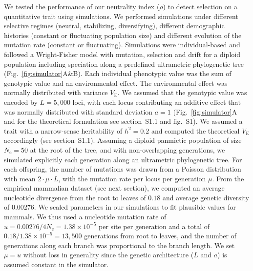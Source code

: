 \documentclass{article}
\newcommand{\Multiply}{\cdot}
\newcommand{\Ne}{N_{\text{e}}}
\newcommand{\Heritability}{h^2}
\newcommand{\MutationRatePheno}{\mu}
\newcommand{\MutationRateNuc}{u}
\newcommand{\NbrLoci}{L}
\newcommand{\VarEnv}{V_{\mathrm{E}}}
\newcommand{\NI}{\rho}
\begin{document}
We tested the performance of our neutrality index ($\NI$) to detect selection on a quantitative trait using simulations.
We performed simulations under different selective regimes (neutral, stabilizing, diversifying), different demographic histories (constant or fluctuating population size) and different evolution of the mutation rate (constant or fluctuating).
Simulations were individual-based and followed a Wright-Fisher model with mutation, selection and drift for a diploid population including speciation along a predefined ultrametric phylogenetic tree (Fig.~\ref{fig:simulator}A\&B).
Each individual phenotypic value was the sum of genotypic value and an environmental effect.
The environmental effect was normally distributed with variance $\VarEnv$.
We assumed that the genotypic value was encoded by $\NbrLoci=5,000$ loci, with each locus contributing an additive effect that was normally distributed with standard deviation $a=1$ (Fig.~\ref{fig:simulator}A and for the theoretical formulation see section~S1.1 and fig.~S1).
We assumed a trait with a narrow-sense heritability of $\Heritability=0.2$ and computed the theoretical $\VarEnv$ accordingly (see section~S1.1).
Assuming a diploid panmictic population of size $\Ne=50$ at the root of the tree, and with non-overlapping generations, we simulated explicitly each generation along an ultrametric phylogenetic tree.
For each offspring, the number of mutations was drawn from a Poisson distribution with mean $2 \Multiply \MutationRatePheno \Multiply \NbrLoci $, with the mutation rate per locus per generation $\MutationRatePheno$.
From the empirical mammalian dataset (see next section), we computed an average nucleotide divergence from the root to leaves of $0.18$ and average genetic diversity of $0.00276$.
We scaled parameters in our simulations to fit plausible values for mammals.
We thus used a nucleotide mutation rate of $\MutationRateNuc=0.00276 / 4 \Ne = 1.38 \times 10^{-5}$ per site per generation  and a total of $0.18 / 1.38 \times 10^{-5} = 13,500$ generations from root to leaves, and the number of generations along each branch was proportional to the branch length.
We set $\MutationRatePheno=\MutationRateNuc$ without loss in generality since the genetic architecture ($\NbrLoci$ and $a$) is assumed constant in the simulator.
\end{document}
